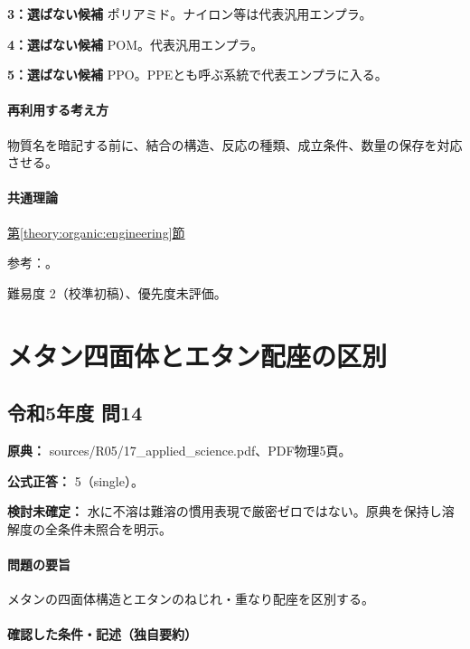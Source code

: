 \noindent\textbf{3：選ばない候補} ポリアミド。ナイロン等は代表汎用エンプラ。\par

\noindent\textbf{4：選ばない候補} POM。代表汎用エンプラ。\par

\noindent\textbf{5：選ばない候補} PPO。PPEとも呼ぶ系統で代表エンプラに入る。\par

\paragraph{再利用する考え方} 物質名を暗記する前に、結合の構造、反応の種類、成立条件、数量の保存を対応させる。

\paragraph{共通理論} \hyperref[theory:organic:engineering]{第\ref*{theory:organic:engineering}節}

\par 参考：\cite{organic_enpla}。

\par 難易度 2（校準初稿）、優先度未評価。

\section{メタン四面体とエタン配座の区別}

\subsection{令和5年度 問14}
\label{q:r05-reg-applied-14}

\noindent\textbf{原典：} sources/R05/17\_applied\_science.pdf、PDF物理5頁。

\textbf{公式正答：} 5（single）。

\par\textbf{検討未確定：} 水に不溶は難溶の慣用表現で厳密ゼロではない。原典を保持し溶解度の全条件未照合を明示。

\paragraph{問題の要旨} メタンの四面体構造とエタンのねじれ・重なり配座を区別する。

\paragraph{確認した条件・記述（独自要約）}\mbox{}\par

